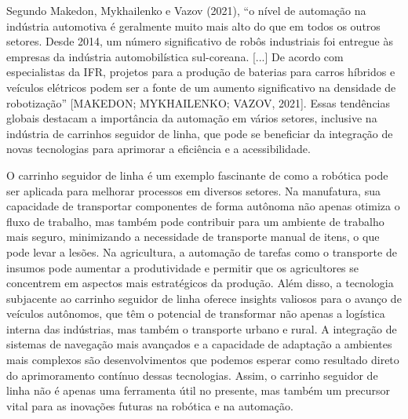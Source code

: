 \documentclass[
  12pt, %
  openright, %
  twoside, %
  a4paper, %
  english, %
  french, %
  spanish, %
  brazil %
]{abntex2}
\begin{document}
\clearpage

Segundo Makedon, Mykhailenko e Vazov (2021), ``o nível de automação na indústria
automotiva é geralmente muito mais alto do que em todos os outros setores. Desde
2014, um número significativo de robôs industriais foi entregue às empresas da
indústria automobilística sul-coreana. [...] De acordo com especialistas da IFR,
projetos para a produção de baterias para carros híbridos e veículos elétricos
podem ser a fonte de um aumento significativo na densidade de robotização''
[MAKEDON; MYKHAILENKO; VAZOV, 2021]. Essas tendências globais destacam a
importância da automação em vários setores, inclusive na indústria de carrinhos
seguidor de linha, que pode se beneficiar da integração de novas tecnologias
para aprimorar a eficiência e a acessibilidade.

O carrinho seguidor de linha é um exemplo fascinante de como a robótica pode ser
aplicada para melhorar processos em diversos setores. Na manufatura, sua
capacidade de transportar componentes de forma autônoma não apenas otimiza o
fluxo de trabalho, mas também pode contribuir para um ambiente de trabalho mais
seguro, minimizando a necessidade de transporte manual de itens, o que pode
levar a lesões. Na agricultura, a automação de tarefas como o transporte de
insumos pode aumentar a produtividade e permitir que os agricultores se
concentrem em aspectos mais estratégicos da produção. Além disso, a tecnologia
subjacente ao carrinho seguidor de linha oferece insights valiosos para o avanço
de veículos autônomos, que têm o potencial de transformar não apenas a logística
interna das indústrias, mas também o transporte urbano e rural. A integração de
sistemas de navegação mais avançados e a capacidade de adaptação a ambientes
mais complexos são desenvolvimentos que podemos esperar como resultado direto do
aprimoramento contínuo dessas tecnologias. Assim, o carrinho seguidor de linha
não é apenas uma ferramenta útil no presente, mas também um precursor vital para
as inovações futuras na robótica e na automação.

%
%
\postextual

%
%

\end{document}
